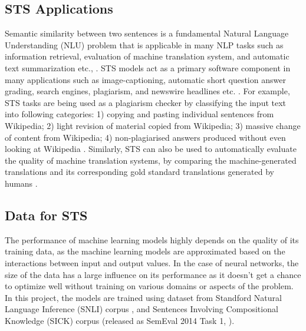 \documentclass[12pt]{report} %
\begin{document}



\subsection{STS Applications}

Semantic similarity between two sentences is a fundamental Natural Language Understanding (NLU) problem that is applicable in many NLP tasks such as information retrieval, evaluation of machine translation system, and automatic text summarization etc., \citep{agirre2016semeval}. STS models act as a primary software component in many applications such as image-captioning, automatic short question answer grading, search engines, plagiarism, and newswire headlines etc. \citep{agirre2016semeval}. For example, STS tasks are being used as a plagiarism checker by classifying the input text into following categories: 1) copying and pasting individual sentences
from Wikipedia; 2) light revision of material copied from Wikipedia; 3) massive change of content from Wikipedia; 4) non-plagiarised answers produced without even looking at Wikipedia \citep{agirre2015semeval}. Similarly, STS can also be used to automatically evaluate the quality of machine translation systems, by comparing the machine-generated translations and its corresponding gold standard translations generated by humans \cite{agirre2015semeval}. 

\subsection{Data for STS}

The performance of machine learning models highly depends on the quality of its training data, as the machine learning models are approximated based on the interactions between input and output values. In the case of neural networks, the size of the data has a large influence on its performance as it doesn't get a chance to optimize well without training on various domains or aspects of the problem. In this project, the models are trained using dataset from Standford Natural Language Inference (SNLI) corpus  \citep{bowman2015large}, and Sentences Involving Compositional
Knowledge (SICK) corpus (released as SemEval 2014 Task 1, \citep{marelli2014semeval}).
\end{document}
